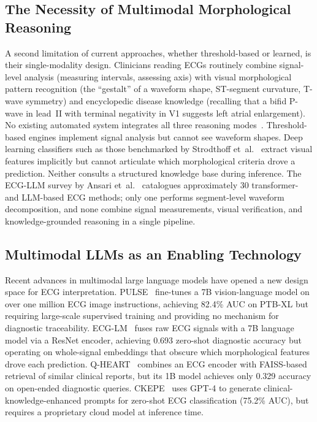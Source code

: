 \documentclass[journal,compsoc]{IEEEtran}
\begin{document}
\subsection{The Necessity of Multimodal Morphological Reasoning}

A second limitation of current approaches, whether threshold-based or learned, is their single-modality design. Clinicians reading ECGs routinely combine signal-level analysis (measuring intervals, assessing axis) with visual morphological pattern recognition (the ``gestalt'' of a waveform shape, ST-segment curvature, T-wave symmetry) and encyclopedic disease knowledge (recalling that a bifid P-wave in lead~II with terminal negativity in V1 suggests left atrial enlargement). No existing automated system integrates all three reasoning modes~\cite{ansari2025ecg_llm_survey}. Threshold-based engines implement signal analysis but cannot see waveform shapes. Deep learning classifiers such as those benchmarked by Strodthoff et~al.~\cite{strodthoff2021deep} extract visual features implicitly but cannot articulate which morphological criteria drove a prediction. Neither consults a structured knowledge base during inference. The ECG-LLM survey by Ansari et~al.~\cite{ansari2025ecg_llm_survey} catalogues approximately 30 transformer- and LLM-based ECG methods; only one performs segment-level waveform decomposition, and none combine signal measurements, visual verification, and knowledge-grounded reasoning in a single pipeline.

\subsection{Multimodal LLMs as an Enabling Technology}

Recent advances in multimodal large language models have opened a new design space for ECG interpretation. PULSE~\cite{li2026pulse} fine-tunes a 7B vision-language model on over one million ECG image instructions, achieving 82.4\% AUC on PTB-XL but requiring large-scale supervised training and providing no mechanism for diagnostic traceability. ECG-LM~\cite{ecg_lm_2025} fuses raw ECG signals with a 7B language model via a ResNet encoder, achieving 0.693 zero-shot diagnostic accuracy but operating on whole-signal embeddings that obscure which morphological features drove each prediction. Q-HEART~\cite{qheart2025} combines an ECG encoder with FAISS-based retrieval of similar clinical reports, but its 1B model achieves only 0.329 accuracy on open-ended diagnostic queries. CKEPE~\cite{ckepe2024} uses GPT-4 to generate clinical-knowledge-enhanced prompts for zero-shot ECG classification (75.2\% AUC), but requires a proprietary cloud model at inference time.
\end{document}
